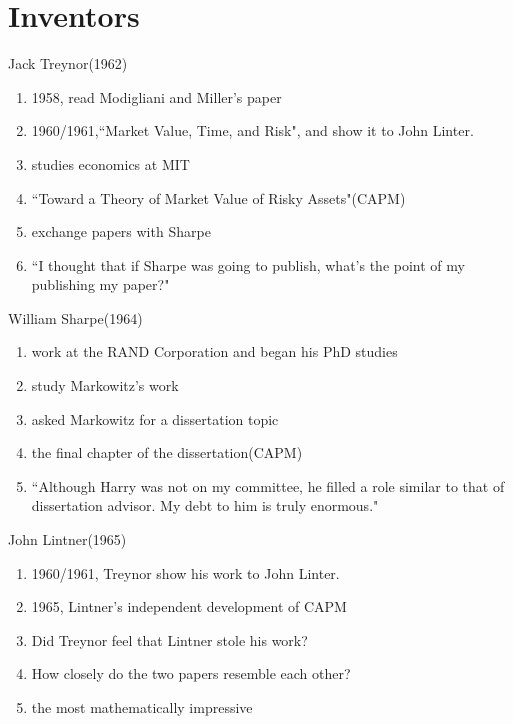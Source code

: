 \documentclass{beamer}
\begin{document}
\section{Inventors}
\begin{frame}{Jack Treynor(1962)}
	\begin{enumerate}[1.]
		\item<2-> 1958, read Modigliani and Miller's paper
		\item<3-> 1960/1961,``Market Value, Time, and Risk", and show it to John Linter.
		\item<4-> studies economics at MIT
		\item<5-> ``Toward a Theory of Market Value of Risky Assets"\alert{(CAPM)}
		\item<6-> exchange papers with Sharpe
		\item<7-> ``I thought that if Sharpe was going to publish, what's the point of my publishing my paper?" 
	\end{enumerate}
\end{frame}
\begin{frame}{William Sharpe(1964)}
	\begin{enumerate}[1.]
		\item<2-> work at the RAND Corporation and began his PhD studies
		\item<3-> study Markowitz's work
		\item<4-> asked Markowitz for a dissertation topic
		\item<5-> the final chapter of the dissertation\alert{(CAPM)}
		\item<6-> ``Although Harry was not on my committee, he filled a role similar to that of dissertation advisor. My debt to him is truly enormous."
	\end{enumerate}
\end{frame}
\begin{frame}{John Lintner(1965)}
	\begin{enumerate}[1.]
		\item<2-> 1960/1961, Treynor show his work to John Linter.
		\item<3-> 1965, Lintner’s \alert{independent} development of CAPM
		\item<4-> Did Treynor feel that Lintner stole his work?
		\item<5-> How closely do the two papers resemble each other?
		\item<6-> \alert{the most mathematically impressive}
	\end{enumerate}
\end{frame}
\end{document}
